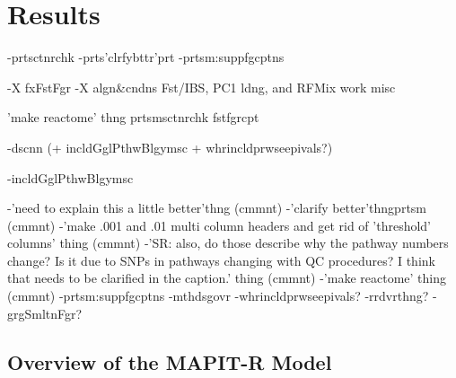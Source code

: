 \documentclass[12pt,a4paper]{article}
\begin{document}
\section{Results}\label{InterPath-Results}

-prtsctnrchk
-prts'clrfybttr'prt
-prtsm:suppfgcptns

-X fxFstFgr
-X algn\&cndns Fst/IBS, PC1 ldng, and RFMix work misc

'make reactome' thng
prtsmsctnrchk
fstfgrcpt

-dscnn (+ incldGglPthwBlgymsc + whrincldprwseepivals?)


-incldGglPthwBlgymsc




-'need to explain this a little better'thng (cmmnt)
-'clarify better'thngprtsm (cmmnt)
-'make .001 and .01 multi column headers and get rid of 'threshold' columns' thing (cmmnt)
-'SR: also, do those describe why the pathway numbers change? Is it due to SNPs in pathways changing with QC procedures? I think that needs to be clarified in the caption.' thing (cmmnt)
-'make reactome' thing (cmmnt)
-prtsm:suppfgcptns
-mthdsgovr
-whrincldprwseepivals?
-rrdvrthng?
-grgSmltnFgr?

\subsection{Overview of the MAPIT-R Model}\label{InterPath-Results-MAPITRModel}
\end{document}
